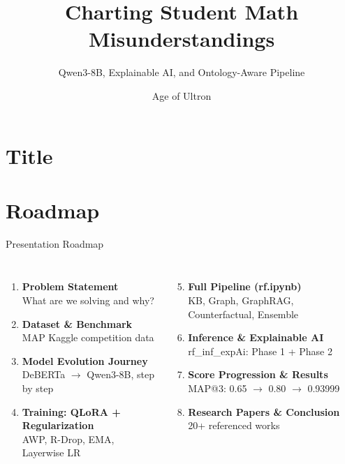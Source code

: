 \documentclass[aspectratio=169]{beamer}
\title{Charting Student Math Misunderstandings}
\subtitle{Qwen3-8B, Explainable AI, and Ontology-Aware Pipeline}
\author[ML Project Team]{Age of Ultron}
\institute{CSE 330 --- Machine Learning Sessional}
\date{}
\begin{document}

\section{Title}
\begin{frame}
  \titlepage
\end{frame}

\section{Roadmap}
\begin{frame}{Presentation Roadmap}
\small
\begin{columns}[T]
\begin{enumerate}
  \item \textbf{Problem Statement}\\{\scriptsize What are we solving and why?}
  \vspace{4pt}
  \item \textbf{Dataset \& Benchmark}\\{\scriptsize MAP Kaggle competition data}
  \vspace{4pt}
  \item \textbf{Model Evolution Journey}\\{\scriptsize DeBERTa $\rightarrow$ Qwen3-8B, step by step}
  \vspace{4pt}
  \item \textbf{Training: QLoRA + Regularization}\\{\scriptsize AWP, R-Drop, EMA, Layerwise LR}
\end{enumerate}
\begin{enumerate}
  \setcounter{enumi}{4}
  \item \textbf{Full Pipeline (rf.ipynb)}\\{\scriptsize KB, Graph, GraphRAG, Counterfactual, Ensemble}
  \vspace{4pt}
  \item \textbf{Inference \& Explainable AI}\\{\scriptsize rf\_inf\_expAi: Phase 1 + Phase 2}
  \vspace{4pt}
  \item \textbf{Score Progression \& Results}\\{\scriptsize MAP@3: 0.65 $\rightarrow$ 0.80 $\rightarrow$ 0.93999}
  \vspace{4pt}
  \item \textbf{Research Papers \& Conclusion}\\{\scriptsize 20+ referenced works}
\end{enumerate}
\end{columns}
\end{frame}
\end{document}
